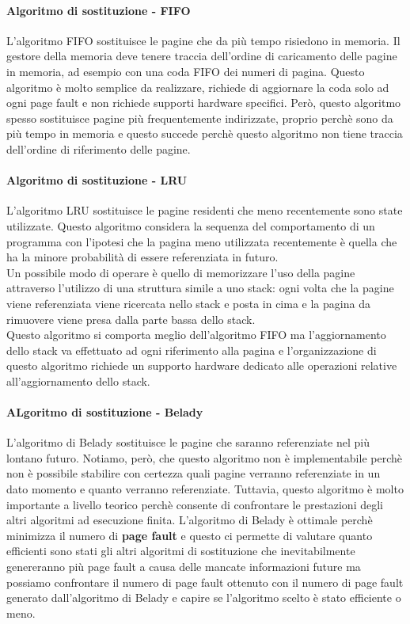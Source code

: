 \documentclass[12pt, letterpaper]{report}
\begin{document}
	\paragraph{Algoritmo di sostituzione - FIFO} L'algoritmo FIFO sostituisce le pagine che da più tempo risiedono in memoria. Il gestore della memoria deve tenere traccia dell'ordine di caricamento delle pagine in memoria, ad esempio con una coda FIFO dei numeri di pagina. Questo algoritmo è molto semplice da realizzare, richiede di aggiornare la coda solo ad ogni page fault e non richiede supporti hardware specifici. Però, questo algoritmo spesso sostituisce pagine più frequentemente indirizzate, proprio perchè sono da più tempo in memoria e questo succede perchè questo algoritmo non tiene traccia dell'ordine di riferimento delle pagine.
	\paragraph{Algoritmo di sostituzione - LRU} L'algoritmo LRU sostituisce le pagine residenti che meno recentemente sono state utilizzate. Questo algoritmo considera la sequenza del comportamento di un programma con l'ipotesi che la pagina meno utilizzata recentemente è quella che ha la minore probabilità di essere referenziata in futuro. \\
	Un possibile modo di operare è quello di memorizzare l'uso della pagine attraverso l'utilizzo di una struttura simile a uno stack: ogni volta che la pagine viene referenziata viene ricercata nello stack e posta in cima e la pagina da rimuovere viene presa dalla parte bassa dello stack. \\
	Questo algoritmo si comporta meglio dell'algoritmo FIFO ma l'aggiornamento dello stack va effettuato ad ogni riferimento alla pagina e l'organizzazione di questo algoritmo richiede un supporto hardware dedicato alle operazioni relative all'aggiornamento dello stack.
	\paragraph{ALgoritmo di sostituzione - Belady} L'algoritmo di Belady sostituisce le pagine che saranno referenziate nel più lontano futuro. Notiamo, però, che questo algoritmo non è implementabile perchè non è possibile stabilire con certezza quali pagine verranno referenziate in un dato momento e quanto verranno referenziate. Tuttavia, questo algoritmo è molto importante a livello teorico perchè consente di confrontare le prestazioni degli altri algoritmi ad esecuzione finita. L'algoritmo di Belady è ottimale perchè minimizza il numero di \textbf{page fault} e questo ci permette di valutare quanto efficienti sono stati gli altri algoritmi di sostituzione che inevitabilmente genereranno più page fault a causa delle mancate informazioni future ma possiamo confrontare il numero di page fault ottenuto con il numero di page fault generato dall'algoritmo di Belady e capire se l'algoritmo scelto è stato efficiente o meno.
\end{document}
